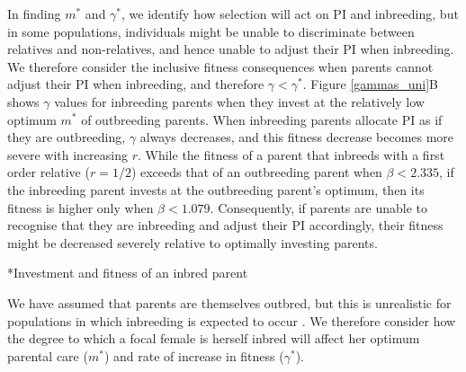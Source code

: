 \documentclass[12pt]{article}
\makeatletter
\renewcommand\subsection{\@startsection{subsection}{1}{-0.25in}{-0.5\baselineskip}{0.1\baselineskip}{\normalfont\normalsize\bfseries\textit}}
\makeatother
\begin{document}
In finding $m^{*}$ and $\gamma^{*}$, we identify how selection will act on PI and inbreeding, but in some populations, individuals might be unable to discriminate between relatives and non-relatives, and hence unable to adjust their PI when inbreeding. We therefore consider the inclusive fitness consequences when parents cannot adjust their PI when inbreeding, and therefore $\gamma < \gamma^{*}$. Figure \ref{gammas_uni}B shows $\gamma$ values for inbreeding parents when they invest at the relatively low optimum $m^{*}$ of outbreeding parents. When inbreeding parents allocate PI as if they are outbreeding, $\gamma$ always decreases, and this fitness decrease becomes more severe with increasing $r$. While the fitness of a parent that inbreeds with a first order relative ($r=1/2$) exceeds that of an outbreeding parent when $\beta < 2.335$, if the inbreeding parent invests at the outbreeding parent's optimum, then its fitness is higher only when $\beta < 1.079$. Consequently, if parents are unable to recognise that they are inbreeding and adjust their PI accordingly, their fitness might be decreased severely relative to optimally investing parents. %

\subsection*{Investment and fitness of an inbred parent}

We have assumed that parents are themselves outbred, but this is unrealistic for populations in which inbreeding is expected to occur \cite[][]{Duthie2015a}. We therefore consider how the degree to which a focal female is herself inbred will affect her optimum parental care ($m^{*}$) and rate of increase in fitness ($\gamma^{*}$).
\end{document}
